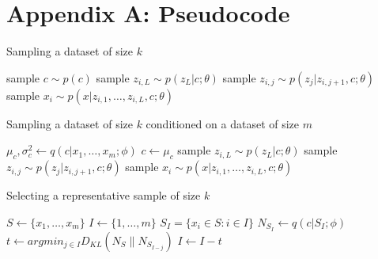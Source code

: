 \documentclass{article} \usepackage{iclr2017_conference,times}
\newcommand{\KL}[2]{D_{KL} \left (#1 \| #2 \right )}
\begin{document}
\section{Appendix A: Pseudocode}
\label{appendix_pseudocode}
\begin{algorithm}[H]
    \caption{Sampling a dataset of size $k$}
    \label{alg:sampling}
    \begin{algorithmic}
        \STATE sample $c \sim p(c)$
            \STATE sample $z_{i,L} \sim p(z_{L} |c; \theta)$
               \STATE sample $z_{i,j} \sim p(z_{j} | z_{i,j+1},c; \theta)$
            \ENDFOR
            \STATE sample $x_{i} \sim p( x | z_{i,1}, \dots, z_{i,L}, c; \theta)$
        \ENDFOR
    \end{algorithmic}
\end{algorithm}
    \begin{algorithm}[H]
    \caption{Sampling a dataset of size $k$ conditioned on a dataset of size $m$} 
    \label{alg:cond_sampling}
    \begin{algorithmic}
        \STATE $\mu_c, \sigma^2_c \gets q(c | x_1, \dots, x_m ; \phi)$ 
        \STATE $c \gets \mu_c$ 
            \STATE sample $z_{i,L} \sim p(z_{L} |c;\theta)$
               \STATE sample $z_{i,j} \sim p(z_{j} | z_{i,j+1},c; \theta)$
            \ENDFOR
            \STATE sample $x_{i} \sim p( x | z_{i,1}, \dots, z_{i,L}, c; \theta)$
        \ENDFOR
    \end{algorithmic}
\end{algorithm}
    \begin{algorithm}[H]
    \caption{Selecting a representative sample of size $k$} 
    \label{alg:subsample}
    \begin{algorithmic}
        \STATE $S \gets \{x_1, \dots, x_m\}$
        \STATE $I \gets \{1, \dots, m \}$
        \STATE $S_I = \{x_i \in S : i \in I  \}$
        \STATE $N_{S_I} \gets q(c | S_I ; \phi)$ 
            \STATE $t \gets argmin_{j \in I} \KL{N_S}{N_{S_{I - j}}}$
            \STATE $I \gets I - t$

        \ENDFOR
    \end{algorithmic}
\end{algorithm}
\end{document}
